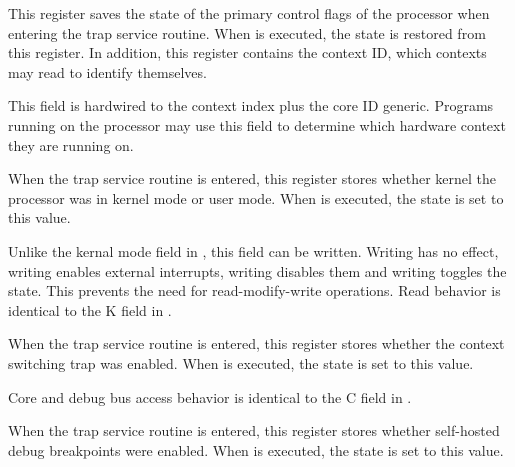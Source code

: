This register saves the state of the primary control flags of the processor when
entering the trap service routine. When  is executed, the state is
restored from this register. In addition, this register contains the context ID,
which contexts may read to identify themselves.

\reset{********}
This field is hardwired to the context index plus the core ID generic. Programs
running on the \rvex{} processor may use this field to determine which hardware
context they are running on.

\implementation{}

When the trap service routine is entered, this register stores whether kernel
the processor was in kernel mode or user mode. When  is executed,
the state is set to this value.

Unlike the kernal mode field in , this field can be written. Writing 
 has no effect, writing  enables external interrupts, writing 
 disables them and writing  toggles the state. This prevents 
the need for read-modify-write operations. Read behavior is identical to the
K field in .

\implementation{}

When the trap service routine is entered, this register stores whether the 
context switching trap was enabled. When  is executed, the state is 
set to this value.

Core and debug bus access behavior is identical to the C field in .

\implementation{}

When the trap service routine is entered, this register stores whether 
self-hosted debug breakpoints were enabled. When  is executed, the 
state is set to this value.

